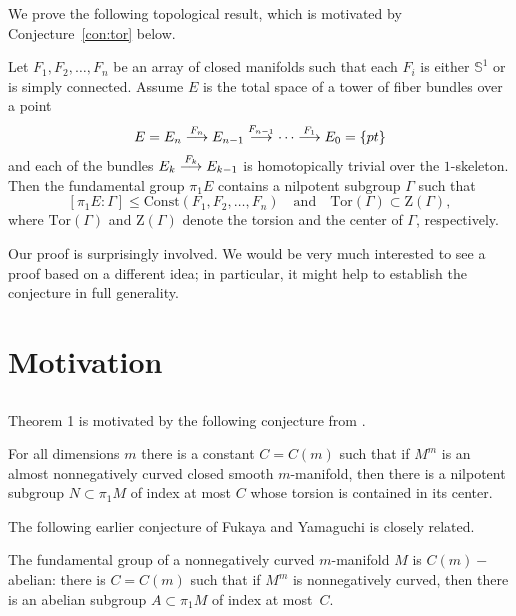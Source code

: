 \documentclass{amsart}
\begin{document}
\noindent 
We prove the following topological result, which is motivated by Conjecture~\ref{con:tor} below.

\begin{thm}\label{thm:smooth}
Let $F_1,F_2,\dots,F_n$ be an array of closed manifolds 
such that each $F_i$ is either $\mathbb{S}^{1}$ or is simply connected. 
Assume $E$ is the total space of a tower of fiber bundles over a point
$$E=E_n\buildrel {F_n}\over \longrightarrow E_{n-1}\buildrel {F_{n-1}}\over\longrightarrow\dots\buildrel {F_1}\over\longrightarrow E_0=\{pt\}$$
and each of the bundles $E_k\buildrel {F_k}\over \longrightarrow E_{k-1}$ is homotopically trivial over the $1$-skeleton. 
Then the fundamental group $\pi_1E$ contains a nilpotent subgroup $\Gamma$ such that
$$[\pi_1E:\Gamma]\le \mathrm{Const}(F_1,F_2,\dots,F_n)\quad\text{and}\quad\mathrm{Tor}(\Gamma)\subset \mathrm{Z}(\Gamma),$$
where $\mathrm{Tor}(\Gamma)$ and $\mathrm{Z}(\Gamma)$ denote the torsion and the center of $\Gamma$, respectively.
\end{thm}

Our proof is surprisingly involved. 
We would be very much interested to see a proof based on a different idea;
in particular, it might help to establish the conjecture in  full generality.

\section{Motivation}

\subsection{} Theorem 1 is motivated by the following conjecture from \cite{KPT}.

\begin{mconj}\label{con:tor}
For all dimensions $m$ there is a constant $C=C(m)$ such that if $M^m$ is an almost nonnegatively curved 
closed smooth $m$-manifold, then there is a nilpotent subgroup $N\subset \pi_1M$ of index  at most $C$ whose torsion is contained in its center.
\end{mconj}

The following earlier conjecture of Fukaya and Yamaguchi \cite{FY} is closely related.

\begin{conj}\label{con:c-ab}
The fundamental group of a nonnegatively curved  $m$-manifold $M$ is $C(m)-$abelian: 
there is $C=C(m)$ such that if $M^m$ is nonnegatively curved, then there is an 
abelian subgroup $A\subset \pi_1M$ of index  at most~$C$.
\end{conj}
\end{document}
